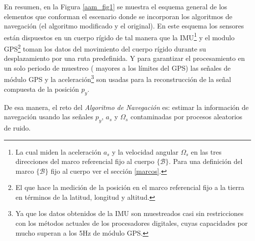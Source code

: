 \documentclass[10pt]{report}
\numberwithin{equation}{chapter}
\numberwithin{algorithm}{chapter}
\newcommand{\marco}[1]{\{\mathcal{#1}\}}
\begin{document}
En resumen, en la Figura \ref{aam_fig1} se muestra el esquema general de los elementos que conforman el escenario donde se incorporan los algoritmos de navegación (el algoritmo modificado y el original). En este esquema los sensores están dispuestos en un cuerpo rígido de tal manera que la IMU\footnote{La cual miden la aceleración $a_s$ y la velocidad angular $\Omega_s$ en las tres direcciones del marco referencial fijo al cuerpo $\marco{B}$. Para una definición del marco $\marco{B}$ fijo al cuerpo ver el sección \ref{marcos}.} y el modulo GPS\footnote{El que hace la medición de la posición en el marco referencial fijo a la tierra en términos de la latitud, longitud y altitud.} toman los datos del movimiento del cuerpo rígido durante su desplazamiento por una ruta predefinida. Y para garantizar el procesamiento en un solo periodo de muestreo ( mayores a los límites del GPS) las señales de módulo GPS y la aceleración\footnote{ Ya que los datos obtenidos de la IMU son muestreados casi sin restricciones con los métodos actuales de los procesadores digitales, cuyas capacidades por mucho superan a los 5Hz de módulo GPS.} son usadas para la reconstrucción de la señal compuesta de la posición $p_y$. \par
De esa manera, el reto del \emph{Algoritmo de Navegación} es: estimar la información de navegación usando las señales $p_y$, $a_s$ y $\Omega_s$ contaminadas por procesos aleatorios de ruido.\par
\end{document}
